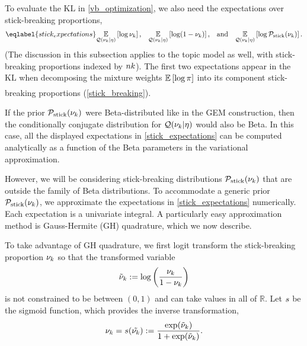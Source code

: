 To evaluate the $\mathrm{KL}$ in \eqref{vb_optimization}, we also need
the expectations over stick-breaking proportions,
\begin{align}\eqlabel{stick_expectations}
%
\expect{\q(\nuk \vert \eta)}{\log \nuk}
\textrm{,}\quad
\expect{\q(\nuk \vert \eta)}{\log (1 - \nuk)}
\textrm{,}\quad\textrm{and}\quad
\expect{\q(\nuk \vert \eta)}{\log \pstick(\nuk)}.
%
\end{align}
(The discussion in this subsection applies to the topic model as well,
with stick-breaking proportions indexed by $nk$).
The first two expectations appear in the $\mathrm{KL}$
when decomposing the mixture weights
$\underset{}{\mathbb{E}}\left[\log \pi\right]$ into its component stick-breaking proportions (\eqref{stick_breaking}).

If the prior $\mathcal{P}_{\mathrm{stick}}(\nu_{k})$ were Beta-distributed like in the GEM construction,
then the conditionally conjugate distribution for $\mathcal{Q}(\nu_{k} \vert \eta)$ would
also be Beta. In this case, all the displayed expectations in
\eqref{stick_expectations} can be computed analytically as a function of the
Beta parameters in the variational approximation.

However, we will be considering stick-breaking distributions $\mathcal{P}_{\mathrm{stick}}(\nu_{k})$
that are outside the family of Beta distributions. To accommodate a generic
prior $\mathcal{P}_{\mathrm{stick}}(\nu_{k})$, we approximate the expectations in
\eqref{stick_expectations} numerically. Each expectation is a univariate
integral. A particularly easy approximation method is Gauss-Hermite (GH)
quadrature, which we now describe.

To take advantage of GH quadrature, we first logit transform the stick-breaking
proportion $\nu_{k}$ so that the transformed variable
\begin{align*}
  \tilde{\nu}_{k} := \log\left(\frac{\nu_{k}}{1 - \nu_{k}}\right)
\end{align*}
is not constrained to be between $(0, 1)$ and can take values in all of $\mathbb{R}$.
Let $s$ be the sigmoid function,
which provides the inverse transformation,
\begin{align*}
  \nu_{k} = s(\tilde{\nu_{k}}) := \frac{\exp(\tilde{\nu}_k)}{1 + \exp(\tilde{\nu}_k)}.
\end{align*}

